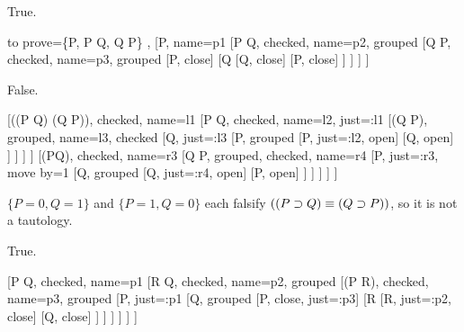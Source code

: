 \begin{earg}

\item \begin{groupitems}
	True.

	\begin{prooftree}
	{
	to prove={\{P, P \eif Q, Q \eif \enot P\} \vdash{}\bot},
	}
	[P, name=p1
	[P \eif Q, checked, name=p2, grouped
	[Q \eif \enot P, checked, name=p3, grouped
		[\enot P, close]
		[Q
			[\enot Q, close]
			[\enot P, close]
		]
	]
	]
	]
	\end{prooftree}
	\end{groupitems}

\item \begin{groupitems}
	False.

	\begin{prooftree}
	{
	}
	[\enot((P \eif Q) \eiff (Q \eif P)), checked, name=l1
		[P \eif Q, checked, name=l2, just={\enot \eiff}:l1
			[\enot (Q \eif P), grouped, name=l3, checked 
				[Q, just={\enot \eif}:l3
				[\enot P, grouped
					[\enot P, just={\eif}:l2, open]
					[Q, open]
				]
				]
			]
		]
		[\enot (P\eif Q), checked, name=r3
		[Q \eif P, grouped, checked, name=r4
			[P, just={\enot \eif}:r3, move by=1
			[\enot Q, grouped
				[\enot Q, just={\eif}:r4, open]
				[P, open]
			]
			]
		]
		]
	]
	\end{prooftree}
	\end{groupitems}

$\{P=0, Q=1\}$ and $\{P=1, Q=0\}$ each falsify $((P \supset Q) \equiv (Q \supset P))$, so it is not a tautology.



\item \begin{groupitems}
	True.

	\begin{prooftree}
	{
	}
	[P \eand Q, checked, name=p1
	[\enot R \eif \enot Q, checked, name=p2, grouped
	[\enot (P \eand R), checked, name=p3, grouped
		[P, just={\eand}:p1
		[Q, grouped
			[\enot P, close, just={\enot \eand}:p3]
			[\enot R
				[\enot \enot R, just={\eif}:p2, close]
				[\enot Q, close]
			]
		]
		]
	]
	]
	]
	\end{prooftree}
	\end{groupitems}



\end{earg}
